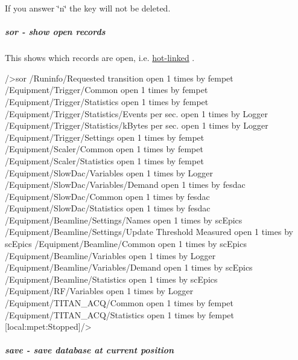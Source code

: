 If you answer \char`\"{}n\char`\"{} the key will not be deleted.



\hypertarget{RC_odbedit_examples_RC_odbedit_sor}{}\subparagraph{sor -\/ show open records}\label{RC_odbedit_examples_RC_odbedit_sor}
This shows which records are open, i.e. \hyperlink{RC_Hot_Link_RC_Hot_Link_Intro}{hot-\/linked} . 
\begin{DoxyCode}
/>sor
/Runinfo/Requested transition open 1 times by fempet
/Equipment/Trigger/Common open 1 times by fempet
/Equipment/Trigger/Statistics open 1 times by fempet
/Equipment/Trigger/Statistics/Events per sec. open 1 times by Logger
/Equipment/Trigger/Statistics/kBytes per sec. open 1 times by Logger
/Equipment/Trigger/Settings open 1 times by fempet
/Equipment/Scaler/Common open 1 times by fempet
/Equipment/Scaler/Statistics open 1 times by fempet
/Equipment/SlowDac/Variables open 1 times by Logger
/Equipment/SlowDac/Variables/Demand open 1 times by fesdac
/Equipment/SlowDac/Common open 1 times by fesdac
/Equipment/SlowDac/Statistics open 1 times by fesdac
/Equipment/Beamline/Settings/Names open 1 times by scEpics
/Equipment/Beamline/Settings/Update Threshold Measured open 1 times by scEpics
/Equipment/Beamline/Common open 1 times by scEpics
/Equipment/Beamline/Variables open 1 times by Logger
/Equipment/Beamline/Variables/Demand open 1 times by scEpics
/Equipment/Beamline/Statistics open 1 times by scEpics
/Equipment/RF/Variables open 1 times by Logger
/Equipment/TITAN_ACQ/Common open 1 times by fempet
/Equipment/TITAN_ACQ/Statistics open 1 times by fempet
[local:mpet:Stopped]/>    
\end{DoxyCode}




\hypertarget{RC_odbedit_examples_RC_odbedit_save}{}\subparagraph{save -\/ save database at current position}\label{RC_odbedit_examples_RC_odbedit_save}

